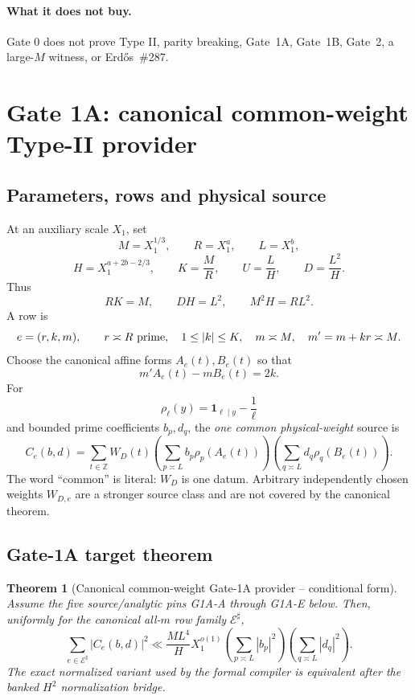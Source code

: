 \documentclass[11pt]{article}
\newtheorem{theorem}{Theorem}[section]
\theoremstyle{definition}
\newcommand{\1}{\mathbf 1}
\begin{document}
\paragraph{What it does not buy.}
Gate 0 does not prove Type II, parity breaking, Gate~1A, Gate~1B, Gate~2, a large-$M$
witness, or Erd\H{o}s~\#287.

\section{Gate 1A: canonical common-weight Type-II provider}
\label{sec:gate1a-theory}

\subsection{Parameters, rows and physical source}

At an auxiliary scale $X_1$, set
\[
M=X_1^{1/3},\qquad
R=X_1^a,\qquad
L=X_1^b,
\]
\[
H=X_1^{a+2b-2/3},\qquad
K=\frac MR,\qquad
U=\frac LH,\qquad
D=\frac{L^2}{H}.
\tag{G1A-scales}
\]
Thus
\[
RK=M,\qquad DH=L^2,\qquad M^2H=RL^2.
\]
A row is
\[
e=(r,k,m),\qquad
r\asymp R\ {\rm prime},\quad
1\le|k|\le K,\quad
m\asymp M,\quad
m'=m+kr\asymp M.
\]
Choose the canonical affine forms $A_e(t),B_e(t)$ so that
\[
\boxed{m'A_e(t)-mB_e(t)=2k.}
\tag{G1A-det}
\]
For
\[
\rho_\ell(y)=\mathbf 1_{\ell\mid y}-\frac1\ell
\]
and bounded prime coefficients $b_p,d_q$, the \emph{one common physical-weight} source is
\[
\boxed{
C_e(b,d)
=
\sum_{t\in\mathbb Z}W_D(t)
\left(\sum_{p\asymp L}b_p\rho_p(A_e(t))\right)
\left(\sum_{q\asymp L}d_q\rho_q(B_e(t))\right).
}
\tag{G1A-source}
\]
The word ``common'' is literal: $W_D$ is one datum.  Arbitrary independently chosen
weights $W_{D,e}$ are a stronger source class and are not covered by the canonical theorem.

\subsection{Gate-1A target theorem}

\begin{theorem}[Canonical common-weight Gate-1A provider -- conditional form]
Assume the five source/analytic pins G1A-A through G1A-E below.  Then, uniformly for the
canonical all-$m$ row family $\mathcal E^\sharp$,
\[
\boxed{
\sum_{e\in\mathcal E^\sharp}|C_e(b,d)|^2
\ll
\frac{ML^4}{H}X_1^{o(1)}
\left(\sum_{p\asymp L}|b_p|^2\right)
\left(\sum_{q\asymp L}|d_q|^2\right).
}
\tag{G1A-target}
\]
The exact normalized variant used by the formal compiler is equivalent after the banked
$H^2$ normalization bridge.
\end{theorem}
\end{document}
